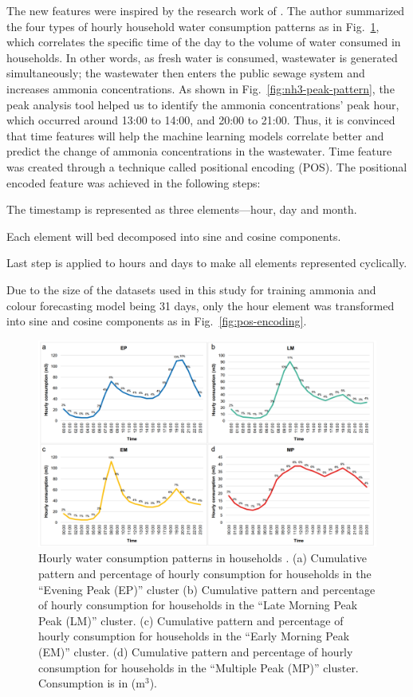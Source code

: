 The new features were inspired by the research work of \citet{abu-bakarQuantifyingImpactCOVID192021}. The author summarized the four types of hourly household water consumption patterns as in Fig.~\ref{fig:water-consumption-pattern}, which correlates the specific time of the day to the volume of water consumed in households. In other words, as fresh water is consumed, wastewater is generated simultaneously; the wastewater then enters the public sewage system and increases ammonia concentrations. As shown in Fig.~\ref{fig:nh3-peak-pattern}, the peak analysis tool helped us to identify the ammonia concentrations' peak hour, which occurred around 13:00 to 14:00, and 20:00 to 21:00. Thus, it is convinced that time features will help the machine learning models correlate better and predict the change of ammonia concentrations in the wastewater. Time feature was created through a technique called positional encoding (POS). The positional encoded feature was achieved in the following steps:

\noindent
\begin{myenumerate}
    \item The timestamp is represented as three elements---hour, day and month.
    \item Each element will bed decomposed into sine and cosine components.
    \item Last step is applied to hours and days to make all elements represented cyclically.
\end{myenumerate}

Due to the size of the datasets used in this study for training ammonia and colour forecasting model being 31 days, only the hour element was transformed into sine and cosine components as in Fig.~\ref{fig:pos-encoding}.

\begin{figure}[!ht]
    \centering
    \includegraphics[width=0.8\columnwidth]{imgs/pre-processing/hourly-consumption-pattern.png}
    \caption{Hourly water consumption patterns in households \citep{abu-bakarQuantifyingImpactCOVID192021}. (a) Cumulative pattern and percentage of hourly consumption for households in the “Evening Peak (EP)” cluster (b) Cumulative pattern and percentage of hourly consumption for households in the “Late Morning Peak Peak (LM)” cluster. (c) Cumulative pattern and percentage of hourly consumption for households in the “Early Morning Peak (EM)” cluster. (d) Cumulative pattern and percentage of hourly consumption for households in the “Multiple Peak (MP)” cluster. Consumption is in (m$^3$).}
    \label{fig:water-consumption-pattern}
 \end{figure}

